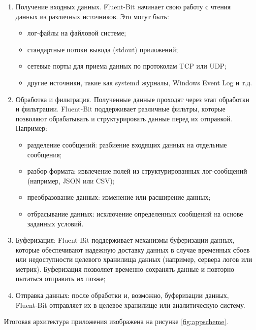 \documentclass[14pt, russian]{scrartcl}
\begin{document}
\begin{enumerate}
	\item Получение входных данных. Fluent-Bit начинает свою работу с чтения данных из различных источников. Это могут быть:
	      \begin{itemize}
		      \item лог-файлы на файловой системе;
		      \item стандартные потоки вывода (stdout) приложений;
		      \item сетевые порты для приема данных по протоколам TCP или UDP;
		      \item другие источники, такие как systemd журналы, Windows Event Log и т.д.
	      \end{itemize}

	\item Обработка и фильтрация. Полученные данные проходят через этап обработки и фильтрации. Fluent-Bit поддерживает различные фильтры, которые позволяют обрабатывать и структурировать данные перед их отправкой. Например:
	      \begin{itemize}
		      \item разделение сообщений: разбиение входящих данных на отдельные сообщения;
		      \item разбор формата: извлечение полей из структурированных лог-сообщений (например, JSON или CSV);
		      \item преобразование данных: изменение или расширение данных;
		      \item отбрасывание данных: исключение определенных сообщений на основе заданных условий.
	      \end{itemize}

	\item Буферизация: Fluent-Bit поддерживает механизмы буферизации данных, которые обеспечивают надежную доставку данных в случае временных сбоев или недоступности целевого хранилища данных (например, сервера логов или метрик). Буферизация позволяет временно сохранять данные и повторно пытаться отправить их позже;

	\item Отправка данных:
	      после обработки и, возможно, буферизации данных, Fluent-Bit отправляет их в целевое хранилище или аналитическую систему.

\end{enumerate}



Итоговая архитектура приложения изображена на рисунке \ref{fig:appscheme}.
\end{document}
